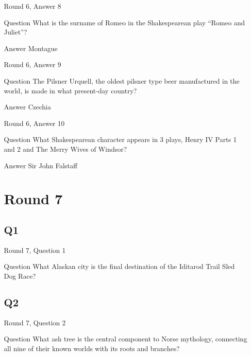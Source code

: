 \documentclass[11pt]{beamer}
\begin{document}
\begin{frame}[t]{Round 6, Answer 8}
\vspace{2em}
\begin{block}{Question}
What is the surname of Romeo in the Shakespearean play ``Romeo and Juliet''\@?
\end{block}
\pause{}
\begin{block}{Answer}
Montague
\end{block}
\end{frame}
    

\begin{frame}[t]{Round 6, Answer 9}
\vspace{2em}
\begin{block}{Question}
The Pilsner Urquell, the oldest pilsner type beer manufactured in the world, is made in what present-day country\@?
\end{block}
\pause{}
\begin{block}{Answer}
Czechia
\end{block}
\end{frame}
    

\begin{frame}[t]{Round 6, Answer 10}
\vspace{2em}
\begin{block}{Question}
What Shakespearean character appears in 3 plays, Henry IV Parts 1 and 2 and The Merry Wives of Windsor\@?
\end{block}
\pause{}
\begin{block}{Answer}
Sir John Falstaff
\end{block}
\end{frame}
    

\section{Round 7}
    

\subsection*{Q1}
\begin{frame}[t]{Round 7, Question 1}
\vspace{2em}
\begin{block}{Question}
What Alaskan city is the final destination of the Iditarod Trail Sled Dog Race\@?
\end{block}
\end{frame}
    

\subsection*{Q2}
\begin{frame}[t]{Round 7, Question 2}
\vspace{2em}
\begin{block}{Question}
What ash tree is the central component to Norse mythology, connecting all nine of their known worlds with its roots and branches\@?
\end{block}
\end{frame}
    
\end{document}

